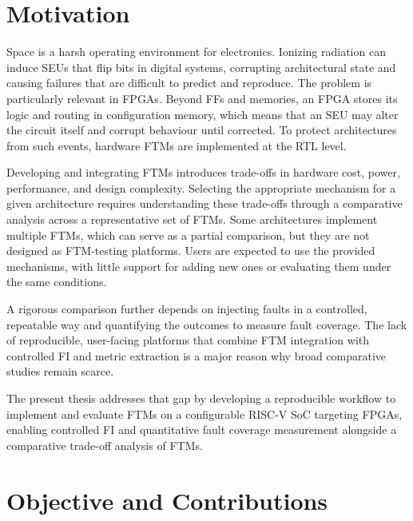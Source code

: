 \label{chap1:intro}


\section{Motivation}
\label{chap1:motivation}
Space is a harsh operating environment for electronics. Ionizing radiation can induce \acp{SEU} that flip bits in digital systems, corrupting architectural state and causing failures that are difficult to predict and reproduce. The problem is particularly relevant in \acp{FPGA}. Beyond \acp{FF} and memories, an \ac{FPGA} stores its logic and routing in configuration memory, which means that an \ac{SEU} may alter the circuit itself and corrupt behaviour until corrected. To protect architectures from such events, hardware \acp{FTM} are implemented at the \ac{RTL} level.

Developing and integrating \acp{FTM} introduces trade-offs in hardware cost, power, performance, and design complexity. Selecting the appropriate mechanism for a given architecture requires understanding these trade-offs through a comparative analysis across a representative set of \acp{FTM}. Some architectures implement multiple \acp{FTM}, which can serve as a partial comparison, but they are not designed as \ac{FTM}-testing platforms. Users are expected to use the provided mechanisms, with little support for adding new ones or evaluating them under the same conditions.

A rigorous comparison further depends on injecting faults in a controlled, repeatable way and quantifying the outcomes to measure fault coverage. The lack of reproducible, user-facing platforms that combine \ac{FTM} integration with controlled \ac{FI} and metric extraction is a major reason why broad comparative studies remain scarce.

The present thesis addresses that gap by developing a reproducible workflow to implement and evaluate \acp{FTM} on a configurable \ac{RISC-V} \ac{SoC} targeting \acp{FPGA}, enabling controlled \ac{FI} and quantitative fault coverage measurement alongside a comparative trade-off analysis of \acp{FTM}.


\section{Objective and Contributions}
\label{chap1:objectives}

